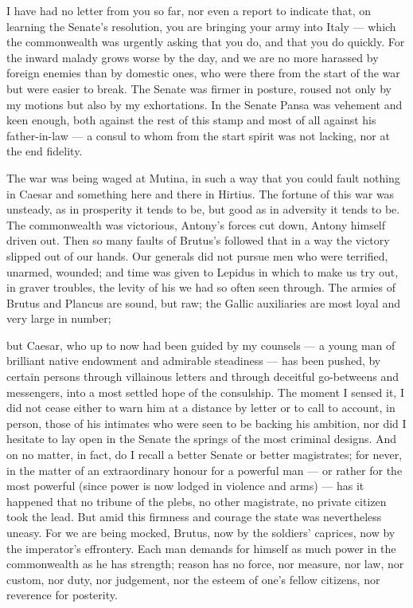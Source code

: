 

 I have had no letter from you so far, nor even a report to indicate that, on learning the Senate's resolution, you are bringing your army into Italy --- which the commonwealth was urgently asking that you do, and that you do quickly. For the inward malady grows worse by the day, and we are no more harassed by foreign enemies than by domestic ones, who were there from the start of the war but were easier to break. The Senate was firmer in posture, roused not only by my motions but also by my exhortations. In the Senate Pansa was vehement and keen enough, both against the rest of this stamp and most of all against his father-in-law --- a consul to whom from the start spirit was not lacking, nor at the end fidelity.

 The war was being waged at Mutina, in such a way that you could fault nothing in Caesar and something here and there in Hirtius. The fortune of this war was unsteady, as in prosperity it tends to be, but good as in adversity it tends to be. The commonwealth was victorious, Antony's forces cut down, Antony himself driven out. Then so many faults of Brutus's followed that in a way the victory slipped out of our hands. Our generals did not pursue men who were terrified, unarmed, wounded; and time was given to Lepidus in which to make us try out, in graver troubles, the levity of his we had so often seen through. The armies of Brutus and Plancus are sound, but raw; the Gallic auxiliaries are most loyal and very large in number;

 but Caesar, who up to now had been guided by my counsels --- a young man of brilliant native endowment and admirable steadiness --- has been pushed, by certain persons through villainous letters and through deceitful go-betweens and messengers, into a most settled hope of the consulship. The moment I sensed it, I did not cease either to warn him at a distance by letter or to call to account, in person, those of his intimates who were seen to be backing his ambition, nor did I hesitate to lay open in the Senate the springs of the most criminal designs. And on no matter, in fact, do I recall a better Senate or better magistrates; for never, in the matter of an extraordinary honour for a powerful man --- or rather for the most powerful (since power is now lodged in violence and arms) --- has it happened that no tribune of the plebs, no other magistrate, no private citizen took the lead. But amid this firmness and courage the state was nevertheless uneasy. For we are being mocked, Brutus, now by the soldiers' caprices, now by the imperator's effrontery. Each man demands for himself as much power in the commonwealth as he has strength; reason has no force, nor measure, nor law, nor custom, nor duty, nor judgement, nor the esteem of one's fellow citizens, nor reverence for posterity.

